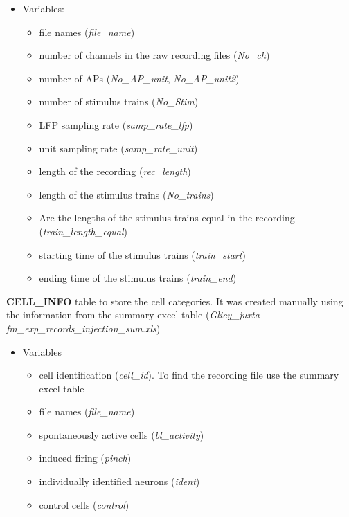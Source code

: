\documentclass[12pt,]{article}
\providecommand{\tightlist}{%
  \setlength{\itemsep}{0pt}\setlength{\parskip}{0pt}}
\begin{document}
\begin{itemize}
\tightlist
\item
  Variables:

  \begin{itemize}
  \tightlist
  \item
    file names (\emph{file\_name})
  \item
    number of channels in the raw recording files (\emph{No\_ch})
  \item
    number of APs (\emph{No\_AP\_unit}, \emph{No\_AP\_unit2})
  \item
    number of stimulus trains (\emph{No\_Stim})
  \item
    LFP sampling rate (\emph{samp\_rate\_lfp})
  \item
    unit sampling rate (\emph{samp\_rate\_unit})
  \item
    length of the recording (\emph{rec\_length})
  \item
    length of the stimulus trains (\emph{No\_trains})
  \item
    Are the lengths of the stimulus trains equal in the recording
    (\emph{train\_length\_equal})
  \item
    starting time of the stimulus trains (\emph{train\_start})
  \item
    ending time of the stimulus trains (\emph{train\_end})
  \end{itemize}
\end{itemize}

\hypertarget{htmlwidget-86ab837c6ef0a33c718d}{}

\hypertarget{htmlwidget-ef282fb4a4e4ffe83a65}{}

\textbf{CELL\_INFO} table to store the cell categories. It was created
manually using the information from the summary excel table
(\emph{Glicy\_juxta-fm\_exp\_records\_injection\_sum.xls})

\begin{itemize}
\tightlist
\item
  Variables

  \begin{itemize}
  \tightlist
  \item
    cell identification (\emph{cell\_id}). To find the recording file
    use the summary excel table
  \item
    file names (\emph{file\_name})
  \item
    spontaneously active cells (\emph{bl\_activity})
  \item
    induced firing (\emph{pinch})
  \item
    individually identified neurons (\emph{ident})
  \item
    control cells (\emph{control})
  \end{itemize}
\end{itemize}
\end{document}
